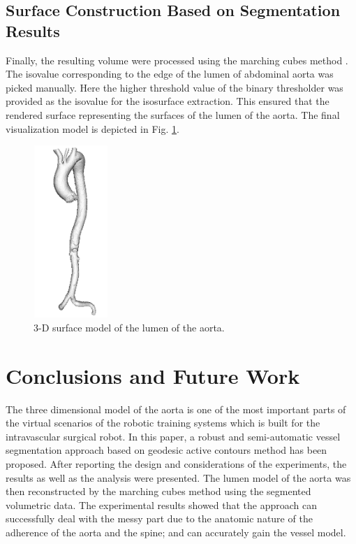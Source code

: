 \subsection{Surface Construction Based on Segmentation Results}
Finally, the resulting volume were processed using the marching cubes method \cite{Lorensen1987MC}.
The isovalue corresponding to the edge of the lumen of abdominal aorta was picked manually.
Here the higher threshold value of the binary thresholder was provided as the isovalue for the isosurface extraction.
This ensured that the rendered surface representing the surfaces of the lumen of the aorta.
The final visualization model is depicted in Fig. \ref{fig:VisualizationModel}.
\begin{figure}[!htb]
\centering
\includegraphics[width=1.1in]{Figures/model.png}
\caption{3-D surface model of the lumen of the aorta.}
\label{fig:VisualizationModel}
\end{figure}


\section{Conclusions and Future Work}

The three dimensional model of the aorta is one of the most important parts of the virtual scenarios of the robotic training systems which is built for the intravascular surgical robot.
In this paper, a robust and semi-automatic vessel segmentation approach based on geodesic active contours method has been proposed.
After reporting the design and considerations of the experiments, the results as well as the analysis were presented.
The lumen model of the aorta was then reconstructed by the marching cubes method using the segmented volumetric data.
The experimental results showed that the approach can successfully deal with the messy part due to the anatomic nature of the adherence of the aorta and the spine; and can accurately gain the vessel model.

